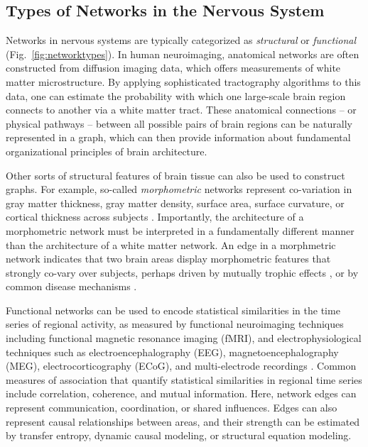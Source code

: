 \documentclass[12pt]{article}
\begin{document}
\subsection*{Types of Networks in the Nervous System}

Networks in nervous systems are typically categorized as \emph{structural} or \emph{functional} (Fig.~\ref{fig:networktypes}). In human neuroimaging, anatomical networks are often constructed from diffusion imaging data, which offers measurements of white matter microstructure. By applying sophisticated tractography algorithms to this data, one can estimate the probability with which one large-scale brain region connects to another via a white matter tract. These anatomical connections -- or physical pathways -- between all possible pairs of brain regions can be naturally represented in a graph, which can then provide information about fundamental organizational principles of brain architecture. 

Other sorts of structural features of brain tissue can also be used to construct graphs. For example, so-called \emph{morphometric} networks represent co-variation in gray matter thickness, gray matter density, surface area, surface curvature, or cortical thickness across subjects \cite{bassett2008,he2007,sanabria2010surface,ronan2012consistency}. Importantly, the architecture of a morphometric network must be interpreted in a fundamentally different manner than the architecture of a white matter network. An edge in a morphmetric network indicates that two brain areas display morphometric features that strongly co-vary over subjects, perhaps driven by mutually trophic effects \cite{Bloch2013}, or by common disease mechanisms \cite{sporns2010networks}.

Functional networks can be used to encode statistical similarities in the time series of regional activity, as measured by functional neuroimaging techniques including functional magnetic resonance imaging (fMRI), and electrophysiological techniques such as electroencephalography (EEG), magnetoencephalography (MEG), electrocorticography (ECoG), and multi-electrode recordings \cite{medaglia2015cognitive}. Common measures of association that quantify statistical similarities in regional time series include correlation, coherence, and mutual information. Here, network edges can represent communication, coordination, or shared influences. Edges can also represent causal relationships between areas, and their strength can be estimated by transfer entropy, dynamic causal modeling, or structural equation modeling. 
\end{document}
